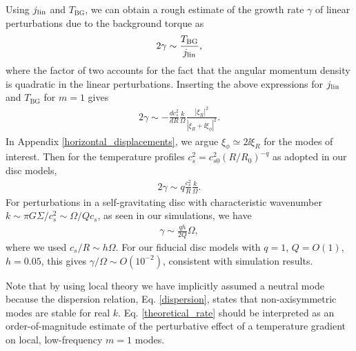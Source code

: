 Using $j_\mathrm{lin}$ and $T_\mathrm{BG}$, we can obtain a rough estimate of
the growth rate $\gamma$ of linear perturbations due to the background
torque as  
\begin{align}
  2\gamma \sim \frac{T_\mathrm{BG}}{j_\mathrm{lin}},
\end{align}
where the factor of two accounts for the fact that the angular momentum
density is quadratic in the linear perturbations. Inserting the above
expressions for $j_\mathrm{lin}$ and $T_\mathrm{BG}$ for $m=1$ gives
\begin{align}
  2\gamma \sim
  -\frac{dc_s^2}{dR}\frac{k}{\Omega}\frac{|\xi_R|^2}{|\xi_R + \ii
    \xi_\phi|^2}. 
\end{align}
In Appendix \ref{horizontal_displacements}, we argue $\xi_\phi \simeq
2\ii \xi_R$ for the modes of interest. Then 
for the temperature profiles $c_s^2 = c_{s0}^2 (R/R_0)^{-q}$ as
adopted in our disc models,  
\begin{align}
  2\gamma \sim q\frac{c_s^2}{R}\frac{k}{\Omega}. 
\end{align}
For perturbations in a self-gravitating disc with characteristic
wavenumber $k \sim \pi G \Sigma/c_s^2 \sim \Omega/Q c_s$, as seen in
our simulations, we have 
\begin{align}\label{theoretical_rate}
  \gamma \sim \frac{qh}{2Q}\Omega,
\end{align}
where we used $c_s/R\sim h\Omega$. For our fiducial disc models with
$q=1$, $Q=O(1)$, $h=0.05$, this gives $\gamma/\Omega \sim O(10^{-2})$,
consistent with simulation results.  

Note that by using local theory we have implicitly
assumed a neutral mode because the dispersion relation,
Eq. \ref{dispersion}, states that non-axisymmetric modes are
stable for real $k$. Eq. \ref{theoretical_rate} should be interpreted
as an order-of-magnitude estimate of the perturbative effect of a
temperature gradient on local, low-frequency $m=1$ modes.  

